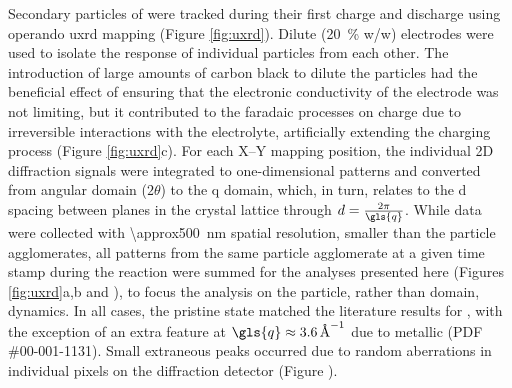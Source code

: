 \documentclass{article}
\begin{document}

Secondary particles of \nca{} were tracked during their first charge
and discharge using operando \gls{uxrd} mapping (Figure
\ref{fig:uxrd}). Dilute (\SI{20}{\percent} w/w) \nca{} electrodes were
used to isolate the response of individual particles from each
other. The introduction of large amounts of carbon black to dilute the
particles had the beneficial effect of ensuring that the electronic
conductivity of the electrode was not limiting, but it contributed to
the faradaic processes on charge due to irreversible interactions with
the electrolyte\cite{kostecki2014}, artificially extending the
charging process (Figure \ref{fig:uxrd}c). For each X--Y mapping
position, the individual 2D diffraction signals were integrated to
one-dimensional patterns and converted from angular domain ($2\theta$)
to the \gls{q} domain, which, in turn, relates to the d spacing
between planes in the crystal lattice through
$d=\frac{2\pi}{\gls{q}}$. While data were collected with
\SI{\approx500}{\nano\meter} spatial resolution, smaller than the
particle agglomerates, all patterns from the same particle agglomerate
at a given time stamp during the reaction were summed for the analyses
presented here (Figures \ref{fig:uxrd}a,b and
), to focus the analysis on the particle,
rather than domain, dynamics. In all cases, the pristine state matched
the literature results for \nca{} \cite{novak2015}, with the exception
of an extra feature at $\gls{q}\approx\SI{3.6}{\per\angstrom}$ due to
metallic  (PDF \#00-001-1131). Small extraneous peaks occurred
due to random aberrations in individual pixels on the diffraction
detector (Figure ).
\end{document}

